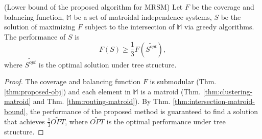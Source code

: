 \begin{theorem}  \label{def:proposed-bound}
 (Lower bound of the proposed algorithm for MRSM) Let $F$ be the coverage and balancing function, $\mathit{\mathbb{M}}$ be a set of matroidal independence systems, $S$ be the solution of maximizing $F$ subject to the intersection of $\mathit{\mathbb{M}}$ via greedy algorithms. The performance of $S$ is
\begin{equation*}
      F(S) \geq \frac{1}{3} F(\widetilde{S^{opt}}),
\end{equation*}
where $\widetilde{S^{opt}}$ is the optimal solution under tree structure.
\end{theorem}
\begin{proof}
The coverage and balancing function $F$ is submodular (Thm. \ref{thm:proposed-obj}) and each element in $\mathit{\mathbb{M}}$ is a matroid (Thm. \ref{thm:clustering-matroid} and Thm. \ref{thm:routing-matroid}).
By Thm. \ref{thm:intersection-matroid-bound}, the performance of the proposed method is guaranteed to find a solution that achieves $\frac{1}{3}\widetilde{OPT}$, where $\widetilde{OPT}$ is the optimal performance under tree structure.
\end{proof}

